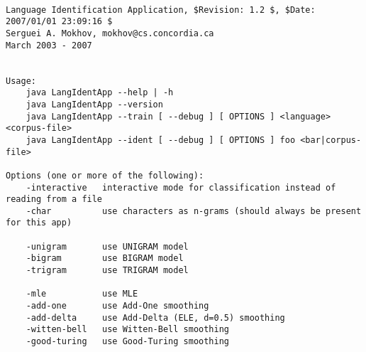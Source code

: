 \begin{verbatim}

Language Identification Application, $Revision: 1.2 $, $Date: 2007/01/01 23:09:16 $
Serguei A. Mokhov, mokhov@cs.concordia.ca
March 2003 - 2007


Usage:
    java LangIdentApp --help | -h
    java LangIdentApp --version
    java LangIdentApp --train [ --debug ] [ OPTIONS ] <language> <corpus-file>
    java LangIdentApp --ident [ --debug ] [ OPTIONS ] foo <bar|corpus-file>

Options (one or more of the following):
    -interactive   interactive mode for classification instead of reading from a file
    -char          use characters as n-grams (should always be present for this app)

    -unigram       use UNIGRAM model
    -bigram        use BIGRAM model
    -trigram       use TRIGRAM model

    -mle           use MLE
    -add-one       use Add-One smoothing
    -add-delta     use Add-Delta (ELE, d=0.5) smoothing
    -witten-bell   use Witten-Bell smoothing
    -good-turing   use Good-Turing smoothing

\end{verbatim}
